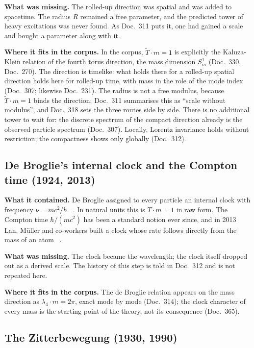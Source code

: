 \textbf{What was missing.} The rolled-up direction was spatial and was added to spacetime. The
radius $R$ remained a free parameter, and the predicted tower of heavy excitations was never found.
As Doc.~311 puts it, one had gained a scale and bought a parameter along with it.

\textbf{Where it fits in the corpus.} In the corpus, $\tilde T\cdot m=1$ is explicitly the
Kaluza-Klein relation of the fourth torus direction, the mass dimension $S^1_m$ (Doc.~330,
Doc.~270). The direction is timelike: what holds there for a rolled-up spatial direction holds here
for rolled-up time, with mass in the role of the mode index (Doc.~307; likewise Doc.~231). The
radius is not a free modulus, because $\tilde T\cdot m=1$ binds the direction; Doc.~311 summarises
this as \enquote{scale without modulus}, and Doc.~318 sets the three routes side by side. There is
no additional tower to wait for: the discrete spectrum of the compact direction already is the
observed particle spectrum (Doc.~307). Locally, Lorentz invariance holds without restriction; the
compactness shows only globally (Doc.~312).

\subsection{De Broglie's internal clock and the Compton time (1924, 2013)}

\textbf{What it contained.} De Broglie assigned to every particle an internal clock with frequency
$\nu=mc^2/h$ \QM~\cite{deBroglie1925}. In natural units this is $T\cdot m=1$ in raw form. The
Compton time $\hbar/(mc^2)$ has been a standard notion ever since, and in 2013 Lan, Müller and
co-workers built a clock whose rate follows directly from the mass of an atom \QM~\cite{Lan2013}.

\textbf{What was missing.} The clock became the wavelength; the clock itself dropped out as a
derived scale. The history of this step is told in Doc.~312 and is not repeated here.

\textbf{Where it fits in the corpus.} The de Broglie relation appears on the mass direction as
$\lambda_4\cdot m=2\pi$, exact mode by mode (Doc.~314); the clock character of every mass is the
starting point of the theory, not its consequence (Doc.~365).

\subsection{The Zitterbewegung (1930, 1990)}

